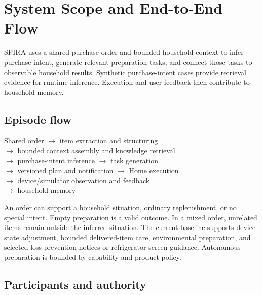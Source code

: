 \section{System Scope and End-to-End Flow}
\label{sec:scope}

SPIRA uses a shared purchase order and bounded household context to infer
purchase intent, generate relevant preparation tasks, and connect those tasks
to observable household results. Synthetic purchase-intent cases provide
retrieval evidence for runtime inference. Execution and user feedback then
contribute to household memory. 

\subsection{Episode flow}

\begin{center}
\small
Shared order $\rightarrow$ item extraction and structuring\\[2pt]
$\rightarrow$ bounded context assembly and knowledge retrieval\\[2pt]
$\rightarrow$ purchase-intent inference $\rightarrow$ task generation\\[2pt]
$\rightarrow$ versioned plan and notification $\rightarrow$ Home execution\\[2pt]
$\rightarrow$ device/simulator observation and feedback\\[2pt]
$\rightarrow$ household memory
\end{center}

An order can support a household situation, ordinary replenishment, or no
special intent. Empty preparation is a valid outcome. In a mixed order,
unrelated items remain outside the inferred situation. The current baseline
supports device-state adjustment, bounded delivered-item care, environmental
preparation, and selected loss-prevention notices or refrigerator-screen
guidance. Autonomous preparation is bounded by capability and product policy.

\subsection{Participants and authority}


